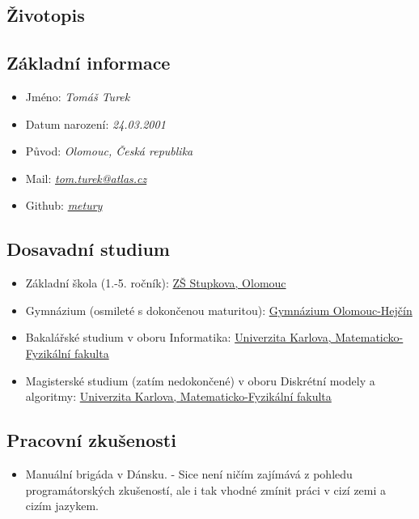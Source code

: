 \documentclass{article}
\begin{document}
\begin{center}
	\section*{Životopis}
\end{center}

\subsection*{Základní informace}

\begin{itemize}
	\item Jméno: \textit{Tomáš Turek}
	\item Datum narození: \textit{24.03.2001}
	\item Původ: \textit{Olomouc, Česká republika}
	\item Mail: \href{mailto:tom.turek@atlas.cz}{\textit{tom.turek@atlas.cz}}
	\item Github: \href{https://github.com/metury}{\textit{metury}}
\end{itemize}

\subsection*{Dosavadní studium}

\begin{itemize}
	\item Základní škola (1.-5. ročník): \href{https://zsstupkova.cz/}{ZŠ Stupkova, Olomouc}
	\item Gymnázium (osmileté s dokončenou maturitou): \href{https://www.gytool.cz/}{Gymnázium Olomouc-Hejčín}
	\item Bakalářské studium v oboru Informatika: \href{https://www.mff.cuni.cz/}{Univerzita Karlova, Matematicko-Fyzikální fakulta}
	\item Magisterské studium (zatím nedokončené) v oboru Diskrétní modely a algoritmy: \href{https://www.mff.cuni.cz/}{Univerzita Karlova, Matematicko-Fyzikální fakulta}
\end{itemize}

\subsection*{Pracovní zkušenosti}

\begin{itemize}
\item Manuální brigáda v Dánsku. - Sice není ničím zajímává z pohledu programátorských zkušeností, ale i tak vhodné zmínit práci v cizí zemi a cizím jazykem.
\end{itemize}
\end{document}
